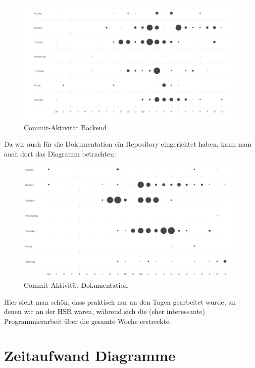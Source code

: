 \documentclass[10pt,a4paper]{scrartcl}
\begin{document}
\begin{figure}[H]
	\begin{center}
		\includegraphics[width=\textwidth]{img/punchcard_back.png}
	\end{center}
	\caption{Commit-Aktivität Backend}
\end{figure}

\newpage
Da wir auch für die Dokumentation ein Repository eingerichtet haben, kann man auch dort das Diagramm
betrachten:

\begin{figure}[H]
	\begin{center}
		\includegraphics[width=\textwidth]{img/punchcard_docs.png}
	\end{center}
	\caption{Commit-Aktivität Dokumentation}
\end{figure}

Hier sieht man schön, dass praktisch nur an den Tagen gearbeitet wurde, an denen wir an der HSR
waren, während sich die (eher interessante) Programmierarbeit über die gesamte Woche erstreckte.


\newpage
\section{Zeitaufwand Diagramme}
\end{document}
